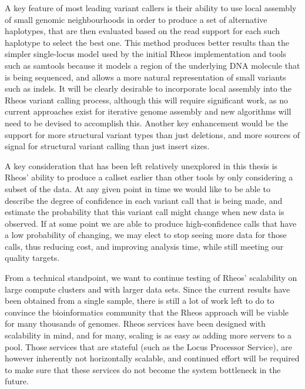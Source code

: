 A key feature of most leading variant callers is their ability to use local assembly of small genomic neighbourhoods in order to produce a set of alternative haplotypes, that are then evaluated based on the read support for each such haplotype to select the best one. This method produces better results than the simpler single-locus model used by the initial Rheos implementation and tools such as samtools because it models a region of the underlying DNA molecule that is being sequenced, and allows a more natural representation of small variants such as indels. It will be clearly desirable to incorporate local assembly into the Rheos variant calling process, although this will require significant work, as no current approaches exist for iterative genome assembly and new algorithms will need to be devised to accomplish this. Another key enhancement would be the support for more structural variant types than just deletions, and more sources of signal for structural variant calling than just insert sizes. 

A key consideration that has been left relatively unexplored in this thesis is Rheos' ability to produce a callset earlier than other tools by only considering a subset of the data. At any given point in time we would like to be able to describe the degree of confidence in each variant call that is being made, and estimate the probability that this variant call might change when new data is observed. If at some point we are able to produce high-confidence calls that have a low probability of changing, we may elect to stop seeing more data for those calls, thus reducing cost, and improving analysis time, while still meeting our quality targets.

From a technical standpoint, we want to continue testing of Rheos' scalability on large compute clusters and with larger data sets. Since the current results have been obtained from a single sample, there is still a lot of work left to do to convince the bioinformatics community that the Rheos approach will be viable for many thousands of genomes. Rheos services have been designed with scalability in mind, and for many, scaling is as easy as adding more servers to a pool. Those services that are stateful (such as the Locus Processor Service), are however inherently not horizontally scalable, and continued effort will be required to make sure that these services do not become the system bottleneck in the future.


